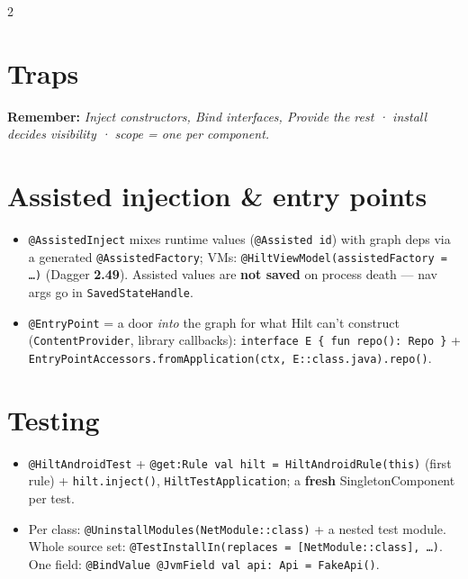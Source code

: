 \documentclass[8pt]{extarticle}
\begin{document}
\begin{multicols}{2}
\section{Traps}
\begin{itemize}\raggedright
\end{itemize}

\textbf{Remember:} \emph{Inject constructors, Bind interfaces, Provide the rest · install decides
visibility · scope = one per component.}

\columnbreak

\section{Assisted injection \& entry points}
\begin{itemize}\raggedright
  \item \texttt{@AssistedInject} mixes runtime values (\texttt{@Assisted id}) with graph deps
        via a generated \texttt{@AssistedFactory}; VMs: \texttt{@HiltViewModel(assistedFactory =
        …)} (Dagger \textbf{2.49}). Assisted values are \textbf{not saved} on process death —
        nav args go in \texttt{SavedStateHandle}.
  \item \texttt{@EntryPoint} = a door \emph{into} the graph for what Hilt can't construct
        (\texttt{ContentProvider}, library callbacks): \texttt{interface E \{ fun repo(): Repo \}}
        + \texttt{EntryPointAccessors.fromApplication(ctx, E::class.java).repo()}.
\end{itemize}

\section{Testing}
\begin{itemize}\raggedright
  \item \texttt{@HiltAndroidTest} + \texttt{@get:Rule val hilt = HiltAndroidRule(this)} (first
        rule) + \texttt{hilt.inject()}, \texttt{HiltTestApplication}; a \textbf{fresh}
        SingletonComponent per test.
  \item Per class: \texttt{@UninstallModules(NetModule::class)} + a nested test module. Whole
        source set: \texttt{@TestInstallIn(replaces = [NetModule::class], …)}. One field:
        \texttt{@BindValue @JvmField val api: Api = FakeApi()}.
\end{itemize}


\end{multicols}
\end{document}
